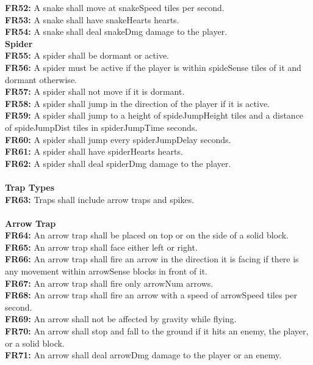 \documentclass[12pt, titlepage]{article}
\begin{document}
\textbf{FR52:} A snake shall move at snakeSpeed tiles per second.\\
\textbf{FR53:} A snake shall have snakeHearts hearts.\\
\textbf{FR54:} A snake shall deal snakeDmg damage to the player.
\\
\textbf{Spider}\\
\textbf{FR55:} A spider shall be dormant or active.\\
\textbf{FR56:} A spider must be active if the player is within spideSense tiles of it and dormant otherwise.\\
\textbf{FR57:} A spider shall not move if it is dormant.\\
\textbf{FR58:} A spider shall jump in the direction of the player if it is active.\\
\textbf{FR59:} A spider shall jump to a height of spideJumpHeight tiles and a distance of spideJumpDist tiles in spiderJumpTime seconds.\\
\textbf{FR60:} A spider shall jump every spiderJumpDelay seconds.\\
\textbf{FR61:} A spider shall have spiderHearts hearts.\\
\textbf{FR62:} A spider shall deal spiderDmg damage to the player.\\
\\
\textbf{Trap Types}\\
\textbf{FR63:} Traps shall include arrow traps and spikes.\\
\\
\textbf{Arrow Trap}\\
\textbf{FR64:} An arrow trap shall be placed on top or on the side of a solid block.\\
\textbf{FR65:} An arrow trap shall face either left or right.\\
\textbf{FR66:} An arrow trap shall fire an arrow in the direction it is facing if there is any movement within arrowSense blocks in front of it.\\
\textbf{FR67:} An arrow trap shall fire only arrowNum arrows.\\
\textbf{FR68:} An arrow trap shall fire an arrow with a speed of arrowSpeed tiles per second.\\
\textbf{FR69:} An arrow shall not be affected by gravity while flying.\\
\textbf{FR70:} An arrow shall stop and fall to the ground if it hits an enemy, the player, or a solid block.\\
\textbf{FR71:} An arrow shall deal arrowDmg damage to the player or an enemy.\\
\end{document}
